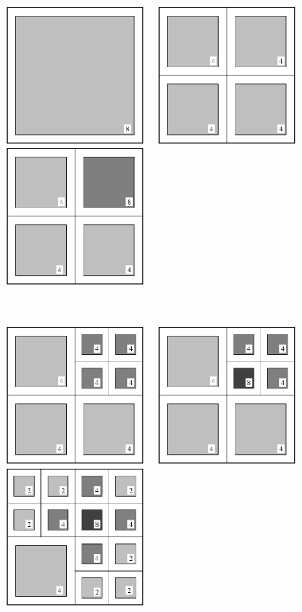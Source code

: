 \centerline{\includegraphics[width=1.8in]{amr2-1.eps} \ \
            \includegraphics[width=1.8in]{amr2-2.eps} \ \
            \includegraphics[width=1.8in]{amr2-3.eps}}
\ \\
\centerline{\includegraphics[width=1.8in]{amr2-4.eps} \ \
            \includegraphics[width=1.8in]{amr2-5.eps} \ \
            \includegraphics[width=1.8in]{amr2-7.eps}}
